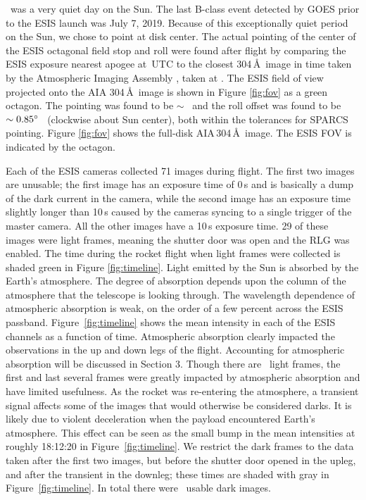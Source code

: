 \documentclass[linenumbers,trackchanges]{aastex63}
\begin{document}
	    \dateMission\ was a very quiet day on the Sun.  
	    The last  B-class event detected by GOES \citep{GOES} prior to the ESIS launch was July 7, 2019.  Because of this exceptionally quiet period on the Sun, we chose to point at disk center. 
	    The actual pointing of the center of the ESIS octagonal field stop and roll were found after flight by comparing the ESIS exposure nearest apogee at \timeApogeeFrame\,UTC to the closest 304\,\AA \ image in time taken by the Atmospheric Imaging Assembly \citep[AIA][]{Lemen2012}, taken at \aianearapogee.  
	    The ESIS field of view projected onto the AIA 304\,\AA\ image is shown in Figure \ref{fig:fov} as a green octagon.  
	    The pointing was found to be $\sim$ \esispointing \ and the roll offset was found to be $\sim 0.85^{\circ}$ \ (clockwise about Sun center), both within the tolerances for SPARCS pointing.  
	    Figure \ref{fig:fov} shows the full-disk AIA\,304\,\AA\ image. 
	    The ESIS FOV is indicated by the octagon.  
	    
		Each of the ESIS cameras collected 71 images during flight.  
		The first two images are unusable; the first image has an exposure time of 0\,s and is basically a dump of the dark current in the camera, while the second image has an exposure time slightly longer than 10\,s caused by the cameras syncing to a single trigger of the master camera.  
		All the other images have a 10\,s exposure time. 
		29 of these images were light frames, meaning the shutter door was open and the RLG was enabled. 
		The time during the rocket flight when light frames were collected is shaded green in Figure \ref{fig:timeline}.  
		Light emitted by the Sun is absorbed by the Earth's atmosphere.  
		The degree of absorption depends upon the column of the atmosphere that the telescope is looking through. The wavelength dependence of atmospheric absorption is weak, on the order of a few percent across the ESIS passband.  
		Figure~\ref{fig:timeline} shows the mean intensity in each of the ESIS channels as a function of time.  Atmospheric absorption clearly impacted the observations in the up and down legs of the flight.  
		Accounting for atmospheric absorption will be discussed in Section 3.  
		Though there are \numDataFrames\ light frames, the first and last several frames were greatly impacted by atmospheric absorption and have limited usefulness.  As the rocket was re-entering the atmosphere, a transient signal affects some of the images that would otherwise be considered darks.  It is likely due to violent deceleration when the payload encountered Earth's atmosphere.
		This effect can be seen as the small bump in the mean intensities at roughly 18:12:20 in Figure~\ref{fig:timeline}.  
		We restrict the dark frames to the data taken after the first two images, but before the shutter door opened in the upleg, and after the transient in the downleg; these times are shaded with gray in Figure~\ref{fig:timeline}.  
		In total there were \numDarkFrames\ usable dark images.  
		
\end{document}
